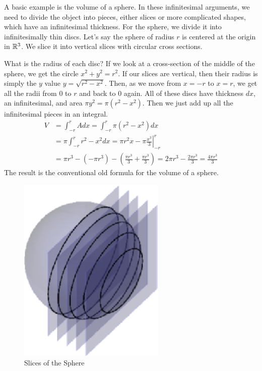 \documentclass[fleqn]{report}
\begin{document}
\begin{example}
A basic example is the volume of a sphere. In these
infinitesimal arguments, we need to divide the object into
pieces, either slices or more complicated shapes, which have
an infinitesimal thickness. For the sphere, we divide it into
infinitesimally thin discs. Let's say the sphere of radius $r$
is centered at the origin in $\mathbb{R}^3$. We slice it into
vertical slices with circular cross sections.

What is the radius of each
disc? If we look at a cross-section of the middle of the
sphere, we get the circle $x^2 + y^2 = r^2$. If our slices
are vertical, then their radius is simply the $y$ value $y =
\sqrt{r^2 - x^2}$. Then, as we move from $x = -r$ to $x = r$,
we get all the radii from $0$ to $r$ and back to $0$ again.
All of these discs have thickness $dx$, an infinitesimal, and
area $\pi y^2 = \pi (r^2 - x^2)$. Then we just add up all the
infinitesimal pieces in an integral.
\begin{align*}
V & = \int_{-r}^r A dx = \int_{-r}^r \pi (r^2 - x^2) dx \\
& = \pi \int_{-r}^r r^2 - x^2 dx = \left. \pi r^2 x - \pi
\frac{x^3}{3} \right|_{-r}^r \\
& = \pi r^3 - (-\pi r^3) - \left( \frac{\pi r^3}{3} +
\frac{\pi r^3}{3} \right) = 2\pi r^3 - \frac{2\pi r^3}{3} =
\frac{4\pi r^3}{3}
\end{align*}
The result is the conventional old formula for the volume of a
sphere. 
\end{example}

\begin{figure}[t]
\centering
\includegraphics[width=7cm]{figure18.eps}
\caption{Slices of the Sphere}
\label{figure-slices-sphere}
\end{figure}
\end{document}
